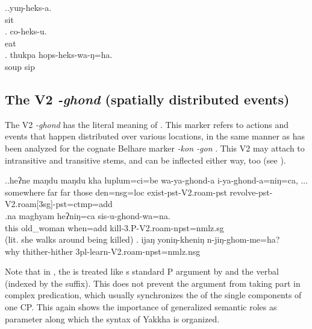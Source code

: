 \ex.\ag.yuŋ-heks-a.\\
sit\\
\bg. co-heks-u.\\
eat\\
\bg. thukpa hops-heks-wa-ŋ=ha.\\
soup sip\\


	
\subsection{The V2 \emph{-ghond} (spatially distributed events)}\label{V2-roam}%


The V2 \emph{-ghond} has the literal meaning of . This marker refers to actions and events that happen distributed over various locations, in the same manner as has been analyzed for the cognate Belhare marker \emph{-kon \ti -gon} \citep[163]{Bickel1996Aspect}. This V2 may attach to intransitive and transitive stems, and can be inflected either way, too (see \Next).


\ex.\ag.heʔne  maŋdu maŋdu kha luplum=ci=be           wa-ya-ghond-a             i-ya-ghond-a=niŋ=ca, ...\\
somewhere far far those den{\sc =nsg=loc} exist{\sc -pst-V2.roam-pst} revolve{\sc -pst-V2.roam[3sg]-pst=ctmp=add}\\
 
\bg.na maghyam heʔniŋ=ca sis-u-ghond-wa=na.\\
	this old\_woman when{\sc =add} kill{\sc -3.P-V2.roam-npst=nmlz.sg}\\
	 (lit. she walks around being killed) 
\bg.	ijaŋ yoniŋ-kheniŋ     n-jiŋ-ghom-me=ha?\\
why thither-hither {\sc 3pl-}learn{\sc -V2.roam-npst=nmlz.nsg}\\


Note that in \Last[b], the  is treated like s standard P argument  by  and the verbal  (indexed by the  suffix). This does not prevent the  argument from taking part in complex predication, which usually synchronizes the  of the single components of one CP. This again shows the importance of generalized semantic roles as parameter along which the syntax of Yakkha is organized. 

